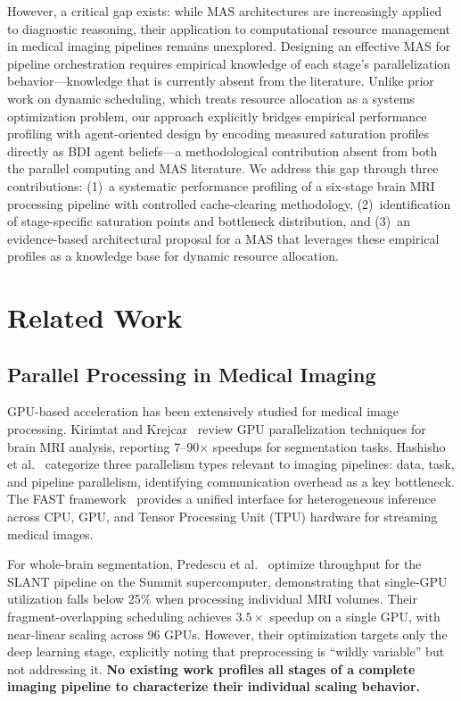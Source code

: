 \documentclass[conference]{IEEEtran}
\begin{document}
However, a critical gap exists: while MAS architectures are increasingly applied to diagnostic reasoning, their application to computational resource management in medical imaging pipelines remains unexplored. Designing an effective MAS for pipeline orchestration requires empirical knowledge of each stage's parallelization behavior---knowledge that is currently absent from the literature. Unlike prior work on dynamic scheduling, which treats resource allocation as a systems optimization problem, our approach explicitly bridges empirical performance profiling with agent-oriented design by encoding measured saturation profiles directly as BDI agent beliefs---a methodological contribution absent from both the parallel computing and MAS literature. We address this gap through three contributions: (1)~a systematic performance profiling of a six-stage brain MRI processing pipeline with controlled cache-clearing methodology, (2)~identification of stage-specific saturation points and bottleneck distribution, and (3)~an evidence-based architectural proposal for a MAS that leverages these empirical profiles as a knowledge base for dynamic resource allocation.

\section{Related Work}

\subsection{Parallel Processing in Medical Imaging}

GPU-based acceleration has been extensively studied for medical image processing. Kirimtat and Krejcar~\cite{kirimtat2024} review GPU parallelization techniques for brain MRI analysis, reporting 7--90$\times$ speedups for segmentation tasks. Hashisho et al.~\cite{hashisho2024} categorize three parallelism types relevant to imaging pipelines: data, task, and pipeline parallelism, identifying communication overhead as a key bottleneck. The FAST framework~\cite{smistad2019} provides a unified interface for heterogeneous inference across CPU, GPU, and Tensor Processing Unit (TPU) hardware for streaming medical images.

For whole-brain segmentation, Predescu et al.~\cite{predescu2024} optimize throughput for the SLANT pipeline on the Summit supercomputer, demonstrating that single-GPU utilization falls below 25\% when processing individual MRI volumes. Their fragment-overlapping scheduling achieves $3.5\times$ speedup on a single GPU, with near-linear scaling across 96 GPUs. However, their optimization targets only the deep learning stage, explicitly noting that preprocessing is ``wildly variable'' but not addressing it. \textbf{No existing work profiles all stages of a complete imaging pipeline to characterize their individual scaling behavior.}
\end{document}
